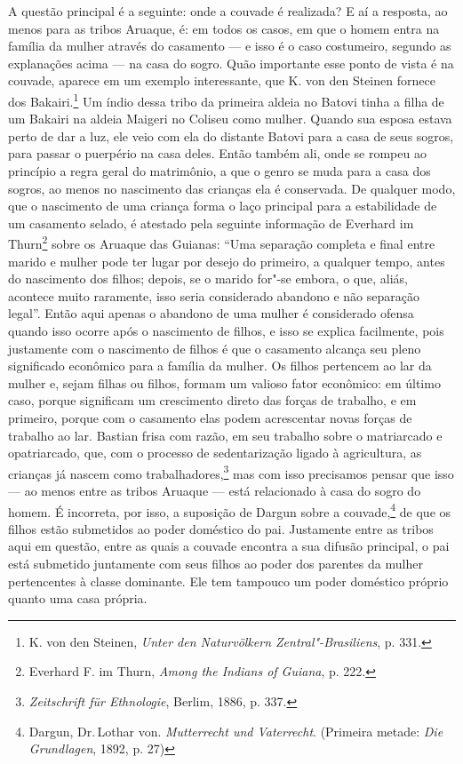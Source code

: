 A questão principal é a seguinte: onde a couvade é realizada? E aí a
resposta, ao menos para as tribos Aruaque, é: em todos os casos, em que
o homem entra na família da mulher através do casamento --- e isso é o
caso costumeiro, segundo as explanações acima --- na casa do sogro. Quão
importante esse ponto de vista é na couvade, aparece em um exemplo
interessante, que K. von den Steinen fornece dos Bakairi.\footnote{K.
  von den Steinen, \emph{Unter den Naturvölkern Zentral"-Brasiliens}, p.
  331.} Um índio dessa tribo da primeira aldeia no Batovi tinha a filha
de um Bakairi na aldeia Maigeri no Coliseu como mulher. Quando sua
esposa estava perto de dar a luz, ele veio com ela do distante Batovi
para a casa de seus sogros, para passar o puerpério na casa deles. Então
também ali, onde se rompeu ao princípio a regra geral do matrimônio, a
que o genro se muda para a casa dos sogros, ao menos no nascimento das
crianças ela é conservada. De qualquer modo, que o nascimento de uma
criança forma o laço principal para a estabilidade de um casamento
selado, é atestado pela seguinte informação de Everhard im
Thurn\footnote{Everhard F. im Thurn, \emph{Among the Indians of Guiana},
  p. 222.} sobre os Aruaque das Guianas: ``Uma separação completa e
final entre marido e mulher pode ter lugar por desejo do primeiro, a
qualquer tempo, antes do nascimento dos filhos; depois, se o marido
for"-se embora, o que, aliás, acontece muito raramente, isso seria
considerado abandono e não separação legal''. Então aqui apenas o
abandono de uma mulher é considerado ofensa quando isso ocorre após o
nascimento de filhos, e isso se explica facilmente, pois justamente com
o nascimento de filhos é que o casamento alcança seu pleno significado
econômico para a família da mulher. Os filhos pertencem ao lar da
mulher e, sejam filhas ou filhos, formam um valioso fator econômico: em
último caso, porque significam um crescimento direto das forças de
trabalho, e em primeiro, porque com o casamento elas podem acrescentar
novas forças de trabalho ao lar. Bastian frisa com razão, em seu
trabalho sobre o matriarcado e opatriarcado, que, com o processo de
sedentarização ligado à agricultura, as crianças já nascem como
trabalhadores,\footnote{\emph{Zeitschrift für Ethnologie}, Berlim, 1886,
  p. 337.} mas com isso precisamos pensar que isso --- ao menos entre as
tribos Aruaque --- está relacionado à casa do sogro do homem. É
incorreta, por isso, a suposição de Dargun sobre a couvade,\footnote{Dargun,
  Dr.\,Lothar von. \emph{Mutterrecht und Vaterrecht}. (Primeira metade:
  \emph{Die Grundlagen}, 1892, p. 27)} de que os filhos estão
submetidos ao poder doméstico do pai. Justamente entre as tribos aqui em
questão, entre as quais a couvade encontra a sua difusão principal, o
pai está submetido juntamente com seus filhos ao poder dos parentes da
mulher pertencentes à classe dominante. Ele tem tampouco um poder
doméstico próprio quanto uma casa própria.

